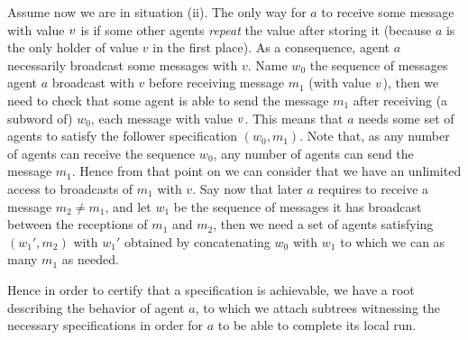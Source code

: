 Assume now we are in situation (ii). The only way for $a$ to receive some message with value $v$ is if some other agents \emph{repeat} the value after storing it (because $a$ is the only holder of value $v$ in the first place). As a consequence, agent $a$ necessarily broadcast some messages with $v$. Name $w_0$ the sequence of messages agent $a$ broadcast with $v$ before receiving message $m_1$ (with value $v$), then we need to check that some agent is able to send the message $m_1$ after receiving (a subword of) $w_0$, each message with value $v$. This  means that $a$ needs some set of agents to satisfy the follower specification $(w_0, m_1)$.
Note that, as any number of agents can receive the sequence $w_0$, any number of agents can send the message $m_1$. Hence from that point on we can consider that we have an unlimited access to broadcasts of $m_1$ with $v$. 
Say now that later $a$ requires to receive a message $m_2 \neq m_1$, and let $w_1$ be the sequence of messages it has broadcast between the receptions of $m_1$ and $m_2$, then we need a set of agents satisfying $(w_1', m_2)$ with $w_1'$ obtained by concatenating $w_0$ with $w_1$ to which we can as many $m_1$ as needed.

Hence in order to certify that a specification is achievable, we have a root describing the behavior of agent $a$, to which we attach subtrees witnessing the necessary specifications in order for $a$ to be able to complete its local run.



